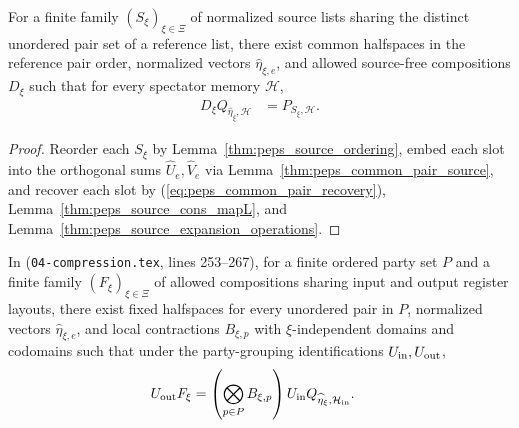 \begin{lemma}
    \label{thm:peps_common_source_lists}
    \leanok
    For a finite family $(S_\xi)_{\xi\in\Xi}$ of normalized source lists sharing
    the distinct unordered pair set of a reference list, there exist common
    halfspaces in the reference pair order, normalized vectors
    $\widehat\eta_{\xi,e}$, and allowed source-free compositions $D_\xi$ such
    that for every spectator memory $\mathcal H$,
    \begin{align}
        D_\xi Q_{\widehat\eta_\xi,\mathcal H}
         & =P_{S_\xi,\mathcal H}.
        \label{eq:peps_common_list_recovery}
    \end{align}
\end{lemma}

\begin{proof}\leanok
    Reorder each $S_\xi$ by Lemma~\ref{thm:peps_source_ordering}, embed each
    slot into the orthogonal sums $\widehat U_e,\widehat V_e$ via
    Lemma~\ref{thm:peps_common_pair_source}, and recover each slot by
    (\ref{eq:peps_common_pair_recovery}), Lemma~\ref{thm:peps_source_cons_mapL},
    and Lemma~\ref{thm:peps_source_expansion_operations}.
\end{proof}

\begin{lemma}
    \label{thm:peps_common_party_maps}
    \leanok
    In \cite[proof of Theorem~5.2]{OpenAI2026PolynomialPEPS}
    (\texttt{04-compression.tex}, lines 253--267), for a finite ordered party
    set $P$ and a finite family $(F_\xi)_{\xi\in\Xi}$ of allowed compositions
    sharing input and output register layouts, there exist fixed halfspaces for
    every unordered pair in $P$, normalized vectors $\widehat\eta_{\xi,e}$, and
    local contractions $B_{\xi,p}$ with $\xi$-independent domains and codomains
    such that under the party-grouping identifications $U_{\rm in},U_{\rm out}$,
    \begin{align}
        U_{\rm out}F_\xi
         & =\left(\bigotimes_{p\in P}B_{\xi,p}\right)
        U_{\rm in}Q_{\widehat\eta_\xi,\mathcal H_{\rm in}}.
        \label{eq:peps_common_party_maps}
    \end{align}
\end{lemma}

